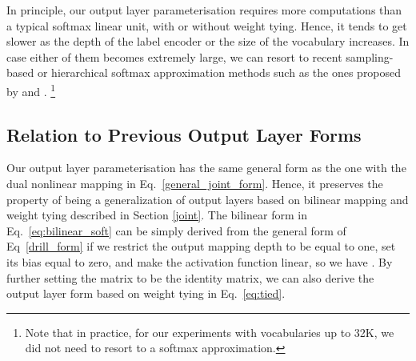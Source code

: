 \documentclass{article}
\begin{document}
In principle, our output layer parameterisation requires more computations than a typical softmax linear unit, with or without weight tying.  Hence, it tends to get slower as the depth of the label encoder or the size of the vocabulary increases. In case either of them becomes extremely large, we can resort to recent sampling-based or hierarchical softmax approximation methods such as the ones proposed by \citet{softapprox2015} and \citet{grave17}.
\footnote{Note that in practice, for our experiments with vocabularies up to 32K, we did not need to resort to a softmax approximation.}

 
\subsection{Relation to Previous Output Layer Forms}
Our output layer parameterisation has the same general form as the one with the dual nonlinear mapping in Eq.~\ref{general_joint_form}.
Hence, it preserves the property of being a generalization of output layers based on bilinear mapping and weight tying described in Section \ref{joint}.
The bilinear form in Eq.~\ref{eq:bilinear_soft} can be simply derived from the general form of Eq~\ref{drill_form} if we restrict the output mapping depth to be equal to one, set its bias equal to zero, and make the  activation function linear, so we have .
By further setting the matrix  to be the identity matrix, we can also derive the output layer form based on weight tying in Eq.~\ref{eq:tied}.
\end{document}
